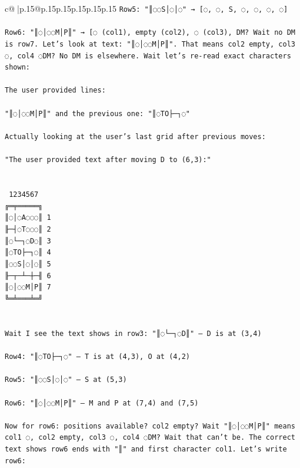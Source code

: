 \documentclass{article}
\begin{document}
{\begin{supertabular}{c@{$\;$}|p{.15\linewidth}@{}p{.15\linewidth}p{.15\linewidth}p{.15\linewidth}p{.15\linewidth}p{.15\linewidth}}
{{{\texttt{Row5: "║◌◌S│◌│◌" → {[}◌, ◌, S, ◌, ◌, ◌, ◌{]}} \\
\\ 
\texttt{Row6: "║◌│◌◌M│P║" → {[}◌ (col1), empty (col2), ◌ (col3), DM? Wait no DM is row7. Let's look at text: "║◌│◌◌M│P║". That means col2 empty, col3 ◌, col4 ◌DM? No DM is elsewhere. Wait let's re{-}read exact characters shown:} \\
\\ 
\texttt{The user provided lines:} \\
\\ 
\texttt{"║◌│◌◌M│P║" and the previous one: "║◌TO├─┐◌"} \\
\\ 
\texttt{Actually looking at the user's last grid after previous moves:} \\
\\ 
\texttt{"The user provided text after moving D to (6,3):"} \\
\\ 
\\ 
\texttt{ 1234567} \\
\texttt{╔═╤═════╗} \\
\texttt{║◌│◌A◌◌◌║ 1} \\
\texttt{╟─┤◌T◌◌◌║ 2} \\
\texttt{║◌└─┐◌D◌║ 3} \\
\texttt{║◌TO├─┐◌║ 4} \\
\texttt{║◌◌S│◌│◌║ 5} \\
\texttt{╟─┬─┴─┼─╢ 6} \\
\texttt{║◌│◌◌M│P║ 7} \\
\texttt{╚═╧═══╧═╝} \\
\\ 
\\ 
\texttt{Wait I see the text shows in row3: "║◌└─┐◌D║" — D is at (3,4)} \\
\\ 
\texttt{Row4: "║◌TO├─┐◌" — T is at (4,3), O at (4,2)} \\
\\ 
\texttt{Row5: "║◌◌S│◌│◌" — S at (5,3)} \\
\\ 
\texttt{Row6: "║◌│◌◌M│P║" — M and P at (7,4) and (7,5)} \\
\\ 
\texttt{Now for row6: positions available? col2 empty? Wait "║◌│◌◌M│P║" means col1 ◌, col2 empty, col3 ◌, col4 ◌DM? Wait that can't be. The correct text shows row6 ends with "║" and first character col1. Let's write row6:} \\
}}}
\end{supertabular}}
\end{document}
